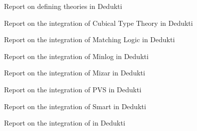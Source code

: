 \begin{workpackage}
\begin{tasklist}
\end{tasklist}

\begin{wpdelivs}
  \begin{wpdeliv}[due=18,id=wp2midterm,dissem=PU,nature=R,lead=Inn]
      {Report on defining theories in Dedukti}
  \end{wpdeliv}
  \begin{wpdeliv}[due=48,id=wp2cubical,dissem=PU,nature=R,lead=Inr]
      {Report on the integration of Cubical Type Theory in Dedukti}
  \end{wpdeliv}
  \begin{wpdeliv}[due=36,id=wp2matching,dissem=PU,nature=R,lead=Ias]
      {Report on the integration of Matching Logic in Dedukti}
  \end{wpdeliv}
  \begin{wpdeliv}[due=48,id=wp2minlog,dissem=PU,nature=R,lead=Lmu]
      {Report on the integration of Minlog in Dedukti}
  \end{wpdeliv}
  \begin{wpdeliv}[due=48,id=wp2mizar,dissem=PU,nature=R,lead=Bia]
      {Report on the integration of Mizar in Dedukti}
  \end{wpdeliv}
  \begin{wpdeliv}[due=48,id=wp2pvs,dissem=PU,nature=R,lead=Inr]
      {Report on the integration of PVS in Dedukti}
  \end{wpdeliv}
  \begin{wpdeliv}[due=48,id=wp2smart,dissem=PU,nature=R,lead=Pro]
      {Report on the integration of \textsf{Smart} in Dedukti}
  \end{wpdeliv}
  \begin{wpdeliv}[due=48,id=wp2tlaplus,dissem=PU,nature=R,lead=Inr]
      {Report on the integration of \tlaplus in Dedukti}
  \end{wpdeliv}
\end{wpdelivs}
\end{workpackage}


